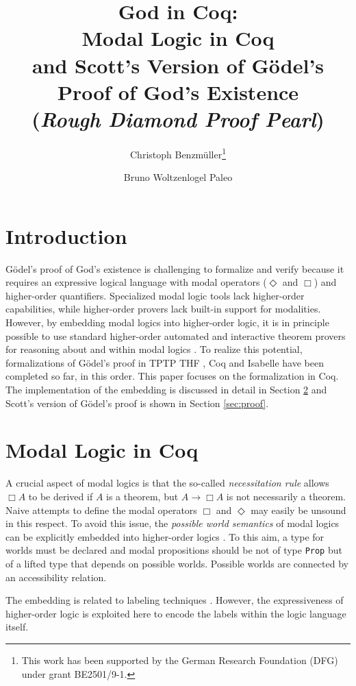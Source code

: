 \documentclass{llncs}
\title{
God in Coq: \\
Modal Logic in Coq \\ 
and Scott's Version of G\"{o}del's Proof of God's Existence \\
{\small (\emph{Rough Diamond Proof Pearl})}
}
\author{
  Christoph Benzm\"{u}ller\inst{1}\thanks{This work has been supported by the German Research Foundation (DFG) under grant BE2501/9-1.} 
  \and 
  Bruno Woltzenlogel Paleo\inst{2}
}
\institute{
  Dahlem Center for Intelligent Systems, Freie Universit\"{a}t Berlin, Germany\\
  \email{c.benzmueller@gmail.com}
  \and 
  Theory and Logic Group, Vienna University of Technology, Austria \\
  \email{bruno@logic.at}
}
\newcommand{\imp}{\rightarrow}
\begin{document}
\maketitle

\section{Introduction}

G\"{o}del's proof of God's existence is challenging to formalize and
verify because it requires an expressive logical language with modal
operators ($\Diamond$ and $\Box$) and higher-order quantifiers.
Specialized modal logic tools lack higher-order capabilities, while
higher-order provers lack built-in support for modalities.  However,
by embedding modal logics into higher-order logic, it is in principle
possible to use standard higher-order automated and interactive
theorem provers for reasoning about and within modal logics
\cite{J23,B9}.  To realize this potential, formalizations
\cite{FormalTheologyRepository} of G\"odel's proof in TPTP THF
\cite{J22}, Coq \cite{Coq} and Isabelle \cite{Isabelle} have been
completed so far, in this order. This paper focuses on the
formalization in Coq. The implementation of the embedding is discussed
in detail in Section \ref{sec:modal} and Scott's version of G\"odel's
proof is shown in Section \ref{sec:proof}.


\section{Modal Logic in Coq}
\label{sec:modal}

A crucial aspect of modal logics \cite{ModalLogic} is that the so-called \emph{necessitation rule} allows $\Box A$ to be derived if $A$ is a theorem, but $A \imp \Box A$ is not necessarily a theorem. Naive attempts to define the modal operators $\Box$ and $\Diamond$ may easily be unsound in this respect. To avoid this issue, the \emph{possible world semantics} of modal logics can be explicitly embedded into higher-order logics \cite{J23,B9}. To this aim, a type for worlds must be declared and modal propositions should be not of type \texttt{Prop} but of a lifted type that depends on possible worlds. Possible worlds are connected by an accessibility relation.

The embedding is related to labeling techniques
\cite{Labels}. However, the expressiveness of higher-order logic is
exploited here to encode the labels within the logic language itself.
\end{document}
